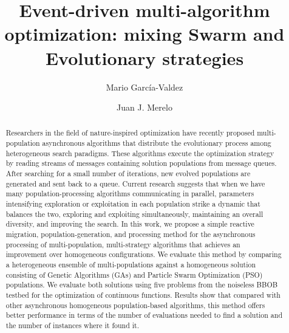 \documentclass[runningheads]{llncs}
\begin{document}
\title{Event-driven multi-algorithm optimization: mixing Swarm and
  Evolutionary strategies}
\author{Mario Garc\'ia-Valdez \and
Juan J. Merelo }


%
\maketitle              %
%
\begin{abstract}

Researchers in the field of nature-inspired optimization have recently
proposed multi-population asynchronous algorithms that distribute the
evolutionary process among heterogeneous search paradigms. These
algorithms execute the optimization strategy by reading streams of
messages containing solution populations from message queues. After
searching for a small number of iterations, new evolved populations
are generated and sent back to a queue. Current research suggests that
when we have many population-processing algorithms communicating in
parallel, parameters intensifying exploration or exploitation in each
population strike a dynamic that balances the two, exploring and
exploiting simultaneously, maintaining an overall diversity, and
improving the search.  In this work, we propose a simple reactive
migration, population-generation, and processing method for
the asynchronous processing of multi-population, multi-strategy
algorithms that achieves an improvement over homogeneous
configurations. We evaluate this method by comparing a heterogeneous
ensemble of multi-populations against a homogeneous solution
consisting of Genetic Algorithms (GAs) and Particle Swarm Optimization
(PSO) populations. We evaluate both solutions using five problems from
the noiseless BBOB testbed for the optimization of continuous
functions. Results show that compared with other asynchronous
homogeneous population-based algorithms, this method offers better
performance in terms of the number of evaluations needed to find a
solution and the number of instances where it found it.

\end{abstract}
%
%
%
\end{document}

